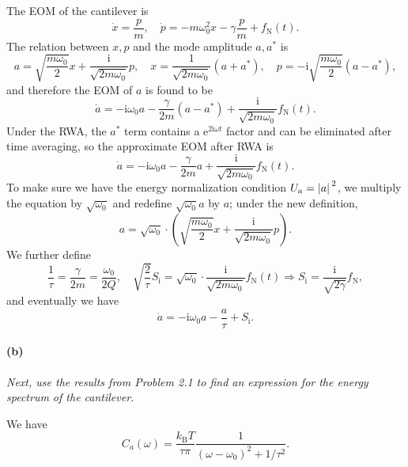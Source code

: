 \documentclass[hyperref, a4paper]{article}
\newcommand*{\ii}{\mathrm{i}}
\newcommand*{\ee}{\mathrm{e}}
\newcommand*{\kB}{k_{\text{B}}}
\newcommand*{\Si}{{S_{\text{i}}}}
\newcommand*{\fn}{f_{\text{N}}}
\begin{document}
The EOM of the cantilever is 
\begin{equation}
    \dot{x} = \frac{p}{m}, \quad \dot{p} = - m \omega_0^2 x - \gamma \frac{p}{m} + \fn(t).
\end{equation}
The relation between $x, p$ and the mode amplitude $a, a^*$ is 
\begin{equation}
    a = \sqrt{\frac{m \omega_0}{2}} x + \frac{\ii}{\sqrt{2 m \omega_0}} p, \quad 
    x = \frac{1}{\sqrt{2 m \omega_0}} (a + a^*), \quad 
    p = - \ii \sqrt{\frac{m \omega_0}{2}} (a - a^*),
    \label{eq:x-p-newton}
\end{equation}
and therefore the EOM of $a$ is found to be 
\begin{equation}
    \dot{a} = - \ii \omega_0 a - \frac{\gamma}{2 m} (a - a^*) + \frac{\ii}{\sqrt{2 m \omega_0}} \fn(t).
\end{equation}
Under the RWA, the $a^*$ term contains a $\ee^{2 \ii \omega t}$ factor and can be eliminated after time averaging,
so the approximate EOM after RWA is 
\begin{equation}
    \dot{a} = - \ii \omega_0 a - \frac{\gamma}{2m} a + \frac{\ii}{\sqrt{2 m \omega_0}} \fn(t).
\end{equation}
To make sure we have the energy normalization condition $U_a = \abs*{a}^2$,
we multiply the equation by $\sqrt{\omega_0}$ and redefine $\sqrt{\omega_0} a$ by $a$;
under the new definition, 
\begin{equation}
    a = \sqrt{\omega_0} \cdot \left(
        \sqrt{\frac{m \omega_0}{2}} x + \frac{\ii}{\sqrt{2 m \omega_0}} p
    \right).
\end{equation}
We further define
\begin{equation}
    \frac{1}{\tau} = \frac{\gamma}{2m} = \frac{\omega_0}{2Q}, \quad 
    \sqrt{\frac{2}{\tau}} \Si =  \sqrt{\omega_0} \cdot \frac{\ii}{\sqrt{2 m \omega_0}} \fn(t) 
    \Rightarrow \Si = \frac{\ii}{\sqrt{2 \gamma}} \fn ,
\end{equation}
and eventually we have 
\begin{equation}
    \dot{a} = - \ii \omega_0 a - \frac{a}{\tau} + \Si.
\end{equation}

\paragraph*{(b)} \textit{Next, use the results from Problem 2.1 to find an expression for the energy spectrum of the cantilever.} 

We have 
\begin{equation}
    C_{a}(\omega) = \frac{\kB T}{\tau \pi} \frac{1}{(\omega - \omega_0)^2 + 1 / \tau^2}.
\end{equation}
\end{document}
